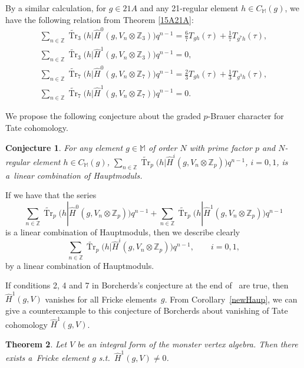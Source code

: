\documentclass[10pt,a4paper]{amsart}
\numberwithin{equation}{section}
\newtheorem{Theorem}{Theorem}[section]
\newtheorem{Conjecture}[Theorem]{Conjecture}
\begin{document}
 By a similar calculation, for $g\in 21A$ and any 21-regular element $h\in C_{\mathbb{M}}(g)$, we have the following relation from Theorem \ref{15A21A}:
\begin{gather*}
\sum_{n\in \mathbb{Z}}\widetilde{\operatorname{Tr}}_3\big(h|\hat{H}^0(g,V_n\otimes \mathbb{Z}_3)\big)q^{n-1}= \frac{6}{7}T_{gh}(\tau)+\frac{1}{7}T_{g^7h}(\tau),\\
\sum_{n\in \mathbb{Z}}\widetilde{\operatorname{Tr}}_3\big(h|\hat{H}^1(g,V_n\otimes \mathbb{Z}_3)\big)q^{n-1}=0,\\
\sum_{n\in \mathbb{Z}}\widetilde{\operatorname{Tr}}_7\big(h|\hat{H}^0(g,V_n\otimes \mathbb{Z}_7)\big)q^{n-1}= \frac{2}{3}T_{gh}(\tau)+\frac{1}{3}T_{g^3h}(\tau),\\
\sum_{n\in \mathbb{Z}}\widetilde{\operatorname{Tr}}_7\big(h|\hat{H}^1(g,V_n\otimes \mathbb{Z}_7)\big)q^{n-1}= 0.
\end{gather*}

We propose the following conjecture about the graded $p$-Brauer character for Tate co\-ho\-mo\-logy.

\begin{Conjecture}
 For any element $g \in \mathbb{M}$ of order $N$ with prime factor $p$ and $N$-regular element $h \in C_{\mathbb{M}}(g)$, $\sum_{n\in \mathbb{Z}}\widetilde{\operatorname{Tr}}_p\big(h|\hat{H}^i(g,V_n\otimes \mathbb{Z}_p)\big)q^{n-1}$, $i=0,1$, is a~linear combination of Hauptmoduls.
\end{Conjecture}

If we have that the series
\[
\sum_{n\in \mathbb{Z}}\widetilde{\operatorname{Tr}}_p\big(h|\hat{H}^0(g,V_n\otimes \mathbb{Z}_p)\big)q^{n-1}+\sum_{n\in \mathbb{Z}}\widetilde{\operatorname{Tr}}_p\big(h|\hat{H}^1(g,V_n\otimes \mathbb{Z}_p)\big)q^{n-1}
\] is a linear combination of Hauptmoduls, then we describe clearly
\[
\sum_{n\in \mathbb{Z}}\widetilde{\operatorname{Tr}}_p\big(h|\hat{H}^i(g,V_n\otimes \mathbb{Z}_p)\big)q^{n-1}, \qquad i=0,1,
\]
by a linear combination of Hauptmoduls.

If conditions 2, 4 and 7 in Borcherds's conjecture at the end of~\cite{B98} are true, then $\hat{H}^1(g,V)$ vanishes for all Fricke elements~$g$.
From Corollary~\ref{newHaup}, we can give a counterexample to this conjecture of Borcherds about vanishing of Tate cohomology $\hat{H}^1(g,V)$.

\begin{Theorem}
Let $V$ be an integral form of the monster vertex algebra. Then there exists a~Fricke element $g$ s.t.\ $\hat{H}^1(g,V)\neq 0$.
\end{Theorem}
\end{document}
